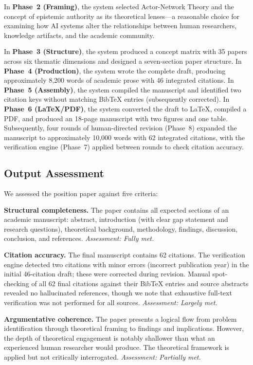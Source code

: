 \documentclass{article}
\begin{document}
In \textbf{Phase~2 (Framing)}, the system selected Actor-Network Theory and the concept of epistemic authority as its theoretical lenses---a reasonable choice for examining how AI systems alter the relationships between human researchers, knowledge artifacts, and the academic community.

In \textbf{Phase~3 (Structure)}, the system produced a concept matrix with 35 papers across six thematic dimensions and designed a seven-section paper structure. In \textbf{Phase~4 (Production)}, the system wrote the complete draft, producing approximately 8,200 words of academic prose with 46 integrated citations. In \textbf{Phase~5 (Assembly)}, the system compiled the manuscript and identified two citation keys without matching BibTeX entries (subsequently corrected). In \textbf{Phase~6 (\LaTeX/PDF)}, the system converted the draft to \LaTeX, compiled a PDF, and produced an 18-page manuscript with two figures and one table. Subsequently, four rounds of human-directed revision (Phase~8) expanded the manuscript to approximately 10,000 words with 62 integrated citations, with the verification engine (Phase~7) applied between rounds to check citation accuracy.

\subsection{Output Assessment}

We assessed the position paper against five criteria:

\textbf{Structural completeness.} The paper contains all expected sections of an academic manuscript: abstract, introduction (with clear gap statement and research questions), theoretical background, methodology, findings, discussion, conclusion, and references. \emph{Assessment: Fully met.}

\textbf{Citation accuracy.} The final manuscript contains 62 citations. The verification engine detected two citations with minor errors (incorrect publication year) in the initial 46-citation draft; these were corrected during revision. Manual spot-checking of all 62 final citations against their BibTeX entries and source abstracts revealed no hallucinated references, though we note that exhaustive full-text verification was not performed for all sources. \emph{Assessment: Largely met.}

\textbf{Argumentative coherence.} The paper presents a logical flow from problem identification through theoretical framing to findings and implications. However, the depth of theoretical engagement is notably shallower than what an experienced human researcher would produce. The theoretical framework is applied but not critically interrogated. \emph{Assessment: Partially met.}
\end{document}
